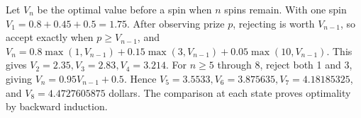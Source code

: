 Let $V_n$ be the optimal value before a spin when $n$ spins remain. With one spin $V_1=0.8+0.45+0.5=1.75$. After observing prize $p$, rejecting is worth $V_{n-1}$, so accept exactly when $p\ge V_{n-1}$, and $V_n=0.8\max(1,V_{n-1})+0.15\max(3,V_{n-1})+0.05\max(10,V_{n-1})$. This gives $V_2=2.35,V_3=2.83,V_4=3.214$. For $n\ge5$ through 8, reject both 1 and 3, giving $V_n=0.95V_{n-1}+0.5$. Hence $V_5=3.5533,V_6=3.875635,V_7=4.18185325$, and $\boxed{V_8=4.4727605875}$ dollars. The comparison at each state proves optimality by backward induction.
